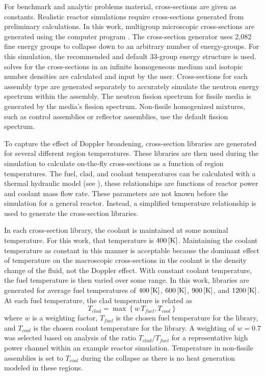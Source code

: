   For benchmark and analytic problems material, cross-sections are given as
  constants. Realistic reactor simulations require
  cross-sections generated from preliminary calculations. In this
  work, multigroup microscopic cross-sections are generated using the computer
  program \mcc \cite{mcc}.
  The cross-section generator uses 2,082 fine energy groups to collapse down
  to an arbitrary number of energy-groups. For this simulation, the
  recommended and default 33-group energy structure is used. \mcc 
  solves for the cross-sections in an infinite homogeneous medium and isotopic 
  number densities are calculated and input by the user.
  Cross-sections for each assembly type are generated separately to accurately
  simulate the neutron energy spectrum within the assembly. The neutron fission  
  spectrum for fissile media is generated by the media's fission spectrum. 
  Non-fissile homogenized mixtures, such as control assemblies or reflector
  assemblies, use the default  fission spectrum. 

  To capture the effect of Doppler broadening, cross-section libraries are
  generated for several different region temperatures. These libraries are
  then used during the simulation to calculate on-the-fly cross-sections as a
  function of region temperatures.
  The fuel, clad, and coolant temperatures can be calculated with a thermal
  hydraulic model (see ), these relationships are 
  functions of reactor power and coolant mass flow rate. These parameters are
  not known before the simulation for a general reactor. Instead, a simplified
  temperature relationship is used to generate the cross-section libraries.

  In each cross-section library, the coolant is maintained at some nominal
  temperature. For this work, that temperature is $400 \left[\text{{K}}\right]$. Maintaining 
  the coolant temperature as constant in this manner is acceptable because the 
  dominant effect of temperature on the macroscopic cross-sections in the 
  coolant is the density change of the fluid, not the Doppler effect. With
  constant coolant temperature, the fuel temperature is then varied over some 
  range. In this work, libraries are generated for average fuel temperatures
  of $400 \left[\text{{K}}\right]$, $600 \left[\text{{K}}\right]$, $900 \left[\text{{K}}\right]$, and $1200 \left[\text{{K}}\right]$.
  At each fuel temperature, the clad temperature is related as 
  \begin{equation}
    T_{clad} = \max \left\{ w \, T_{fuel}, T_{cool} \right\}
  \end{equation}
  where $w$ is a weighting factor, $T_{fuel}$ is the chosen fuel temperature
  for the library, and $T_{cool}$ is the chosen coolant temperature for the
  library. A weighting of $w=0.7$ was selected based on analysis of the ratio
  $T_{clad}/T_{fuel}$ for a representative high power channel
  within an example reactor simulation.  Temperature in non-fissile assemblies 
  is set to $T_{cool}$ during the collapse as there is no heat generation 
  modeled in these regions.

